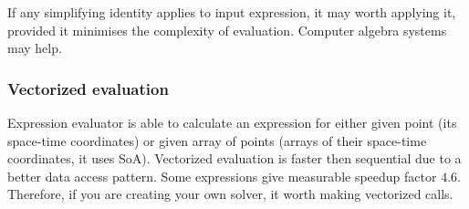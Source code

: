 If any simplifying identity applies to input expression, it may worth applying
it, provided it minimises the complexity of evaluation. Computer algebra systems
may help.

\subsubsection{Vectorized evaluation}

Expression evaluator is able to calculate an expression for either given point
(its space-time coordinates) or given array of points (arrays of their
space-time coordinates, it uses SoA). Vectorized evaluation is faster then
sequential due to a better data access pattern. Some expressions give measurable
speedup factor $4.6$. Therefore, if you are creating your own solver, it
worth making vectorized calls.
